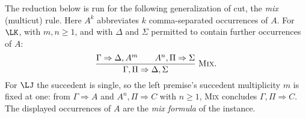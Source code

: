 The reduction below is run for the following generalization of cut, the
\emph{mix} (multicut) rule.  Here \(A^{k}\) abbreviates \(k\)
comma-separated occurrences of \(A\).  For \(\LK\), with \(m,n\geq1\),
and with \(\Delta\) and \(\Sigma\) permitted to contain further
occurrences of \(A\):
\[
\frac{\Gamma\Rightarrow\Delta,A^{m}
      \qquad
      A^{n},\Pi\Rightarrow\Sigma}
     {\Gamma,\Pi\Rightarrow\Delta,\Sigma}\;\textsc{Mix}.
\]
For \(\LJ\) the succedent is single, so the left premise's succedent
multiplicity \(m\) is fixed at one: from \(\Gamma\Rightarrow A\) and
\(A^{n},\Pi\Rightarrow C\) with \(n\geq1\), \textsc{Mix} concludes
\(\Gamma,\Pi\Rightarrow C\).  The displayed occurrences of \(A\) are the
\emph{mix formula} of the instance.
